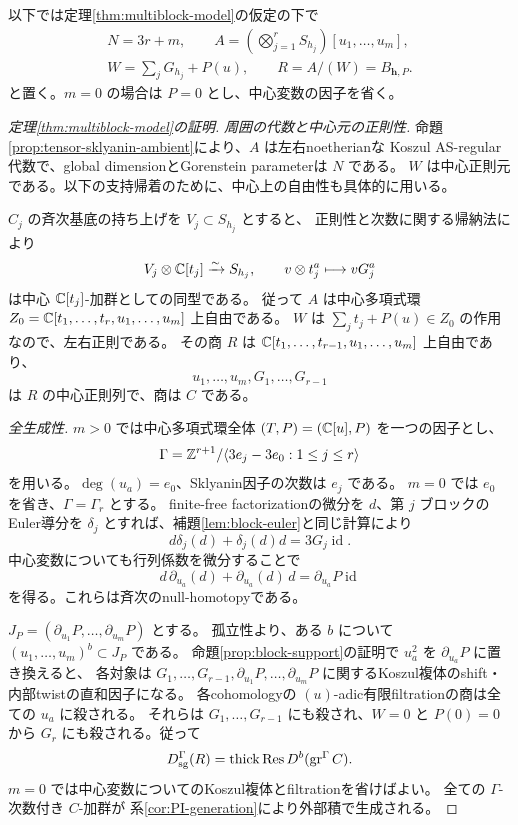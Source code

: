 以下では定理\ref{thm:multiblock-model}の仮定の下で
\[
 \begin{gathered}
 N=3r+m,\qquad A=\left(\bigotimes_{j=1}^rS_{h_j}\right)[u_1,\ldots,u_m],\\
 W=\sum_jG_{h_j}+P(u),\qquad R=A/(W)=B_{\mathbf h,P}.
 \end{gathered}
\]
と置く。\(m=0\) の場合は \(P=0\) とし、中心変数の因子を省く。

\begin{proof}[定理\ref{thm:multiblock-model}の証明]

 \emph{周囲の代数と中心元の正則性.}
 命題\ref{prop:tensor-sklyanin-ambient}により、\(A\) は左右noetherianな
 Koszul AS-regular代数で、global dimensionとGorenstein parameterは \(N\) である。
 \(W\) は中心正則元である。以下の支持帰着のために、中心上の自由性も具体的に用いる。

 \(C_j\) の斉次基底の持ち上げを \(V_j\subset S_{h_j}\) とすると、
 正則性と次数に関する帰納法により
 \[
 V_j\otimes\mathbb C[t_j]\xrightarrow{\sim}S_{h_j},\qquad
 v\otimes t_j^a\longmapsto vG_j^a
 \]
 は中心 \(\mathbb C[t_j]\)-加群としての同型である。
 従って \(A\) は中心多項式環
 \(Z_0=\mathbb C[t_1,\ldots,t_r,u_1,\ldots,u_m]\) 上自由である。
 \(W\) は \(\sum_jt_j+P(u)\in Z_0\) の作用なので、左右正則である。
 その商 \(R\) は
 \(\mathbb C[t_1,\ldots,t_{r-1},u_1,\ldots,u_m]\) 上自由であり、
 \[
 u_1,\ldots,u_m,G_1,\ldots,G_{r-1}
 \]
 は \(R\) の中心正則列で、商は \(C\) である。

 \emph{全生成性.}
 \(m>0\) では中心多項式環全体 \((T,P)=(\mathbb C[u],P)\) を一つの因子とし、
 \[
 \Gamma=\mathbb Z^{r+1}/\langle3e_j-3e_0:1\le j\le r\rangle
 \]
 を用いる。\(\deg(u_a)=e_0\)、Sklyanin因子の次数は \(e_j\) である。
 \(m=0\) では \(e_0\) を省き、\(\Gamma=\Gamma_r\) とする。
 finite-free factorizationの微分を \(d\)、第 \(j\) ブロックのEuler導分を
 \(\delta_j\) とすれば、補題\ref{lem:block-euler}と同じ計算により
 \[
 d\delta_j(d)+\delta_j(d)d=3G_j\operatorname{id}.
 \]
 中心変数についても行列係数を微分することで
 \[
 d\,\partial_{u_a}(d)+\partial_{u_a}(d)\,d
 =\partial_{u_a}P\operatorname{id}
 \]
 を得る。これらは斉次のnull-homotopyである。

 \(J_P=(\partial_{u_1}P,\ldots,\partial_{u_m}P)\) とする。
 孤立性より、ある \(b\) について \((u_1,\ldots,u_m)^b\subset J_P\) である。
 命題\ref{prop:block-support}の証明で \(u_a^2\) を \(\partial_{u_a}P\) に置き換えると、
 各対象は \(G_1,\ldots,G_{r-1},\partial_{u_1}P,\ldots,\partial_{u_m}P\)
 に関するKoszul複体のshift・内部twistの直和因子になる。
 各cohomologyの \((u)\)-adic有限filtrationの商は全ての \(u_a\) に殺される。
 それらは \(G_1,\ldots,G_{r-1}\) にも殺され、\(W=0\) と \(P(0)=0\) から
 \(G_r\) にも殺される。従って
 \[
 D_{\mathrm{sg}}^\Gamma(R)
 =\operatorname{thick}\operatorname{Res}D^b(\operatorname{gr}^\Gamma C).
 \]
 \(m=0\) では中心変数についてのKoszul複体とfiltrationを省けばよい。
 全ての \(\Gamma\)-次数付き \(C\)-加群が
 系\ref{cor:PI-generation}により外部積で生成される。


\end{proof}
